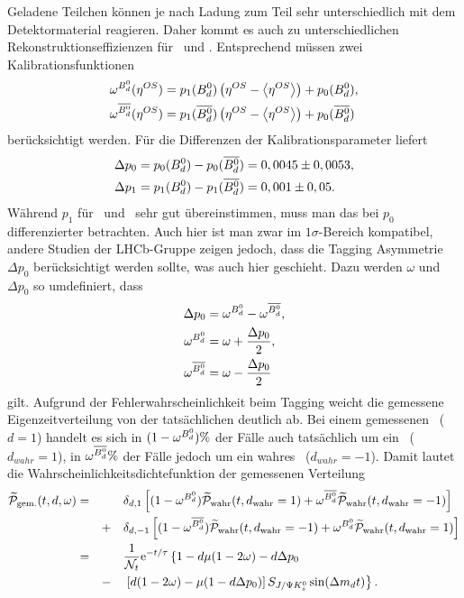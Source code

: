 Geladene Teilchen können je nach Ladung zum Teil sehr unterschiedlich mit dem Detektormaterial reagieren. Daher kommt es auch zu unterschiedlichen Rekonstruktionseffizienzen für \Bd\ und \Bdbar. Entsprechend müssen zwei Kalibrationsfunktionen 
\begin{align}
\omega^{\text{$B_d^0$}}(\eta^{OS}) &= p_1(\text{$B_d^0$})\left(\eta^{OS}-\left\langle \eta^{OS} \right\rangle\right) + p_0(\text{$B_d^0$}) , \\
\omega^{\text{$\overline{B_d^0}$}}(\eta^{OS}) &= p_1(\text{$\overline{B_d^0}$})\left(\eta^{OS}-\left\langle \eta^{OS} \right\rangle\right) + p_0(\text{$\overline{B_d^0}$})
\end{align}
berücksichtigt werden. Für die Differenzen der Kalibrationsparameter liefert \cite{tagging}
\begin{align}
\Delta p_0 &= p_0(\text{$B_d^0$}) - p_0(\text{$\overline{B_d^0}$}) = 0,0045 \pm 0,0053, \\
\Delta p_1 &= p_1(\text{$B_d^0$}) - p_1(\text{$\overline{B_d^0}$}) = 0,001 \pm 0,05 .
\end{align}
Während $p_1$ für \Bd\ und \Bdbar\ sehr gut übereinstimmen, muss man das bei $p_0$ differenzierter betrachten. Auch hier ist man zwar im $1\sigma$-Bereich kompatibel, andere Studien der LHCb-Gruppe zeigen jedoch, dass die Tagging Asymmetrie $\Delta p_0$ berücksichtigt werden sollte, was auch hier geschieht. Dazu werden $\omega$ und $\Delta p_0$ so umdefiniert, dass
\begin{align}
\Delta p_0 &= \omega^{\text{$B_d^0$}} - \omega^{\text{$\overline{B_d^0}$}}, \\
\omega^{\text{$B_d^0$}} &= \omega + \frac{\Delta p_0}{2},  \\
\omega^{\text{$\overline{B_d^0}$}} &= \omega - \frac{\Delta p_0}{2}
\end{align}
gilt. Aufgrund der Fehlerwahrscheinlichkeit beim Tagging weicht die gemessene Eigenzeitverteilung von der tatsächlichen deutlich ab. Bei einem gemessenen \Bd\ ($d=1$) handelt es sich in $(1-\omega^{\text{$B_d^0$}})\%$ der Fälle auch tatsächlich um ein \Bd\ ($d_{wahr}=1$), in $\omega^{\text{$\overline{B_d^0}$}}\%$ der Fälle jedoch um ein wahres \Bdbar\ ($d_{wahr}=-1$). Damit lautet die Wahrscheinlichkeitsdichtefunktion der gemessenen Verteilung
\begin{alignat}{3}
\nonumber\widetilde{\mathcal{P}}_{\text{gem.}}(t, d, \omega) &= && &&\delta_{d,1} \left[(1-\omega^{\text{$B_d^0$}})\widetilde{\mathcal{P}}_{\text{wahr}}(t, d_{\text{wahr}}=1) + \omega^{\text{$\overline{B_d^0}$}}\widetilde{\mathcal{P}}_{\text{wahr}}(t, d_{\text{wahr}}=-1)\right]\\
\nonumber & && + &&\delta_{d,-1} \left[(1-\omega^{\text{$\overline{B_d^0}$}})\widetilde{\mathcal{P}}_{\text{wahr}}(t, d_{\text{wahr}}=-1) + \omega^{\text{$B_d^0$}}\widetilde{\mathcal{P}}_{\text{wahr}}(t, d_{\text{wahr}}=1)\right] \\
\nonumber &= && &&\frac{1}{\mathcal{N}_t}\mathrm{e}^{-t/\tau} \left\lbrace 1-d\mu(1-2\omega)-d\Delta p_0 \right. \\
& && - && \left.\left[d(1-2\omega)-\mu(1-d\Delta p_0)\right]S_{J/\Psi K_s^0}\sin(\Delta m_d t)\right\rbrace. \label{eq:fit_pdf_vorlaeufig}
\end{alignat}

